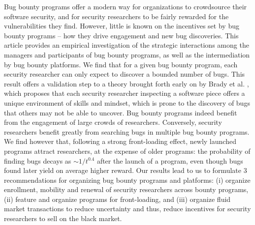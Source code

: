 Bug bounty programs offer a modern way for organizations to crowdsource their software security, and for security researchers to be fairly rewarded for the vulnerabilities they find. However, little is known on the incentives set by bug bounty programs -- how they drive engagement and new bug discoveries. This article provides an empirical investigation of the strategic interactions among the managers and participants of bug bounty programs, as well as the intermediation by bug bounty platforms. We find that for a given bug bounty program, each security researcher can only expect to discover a bounded number of bugs. This result offers a validation step to a theory brought forth early on by Brady et al. \cite{brady1999murphy}, which proposes that each security researcher inspecting a software piece offers a unique environment of skills and mindset, which is prone to the discovery of bugs that others may not be able to uncover. Bug bounty programs indeed benefit from the engagement of large crowds of researchers. Conversely, security researchers benefit greatly from searching bugs in multiple bug bounty programs. We find however that, following a strong front-loading effect, newly launched programs attract researchers, at the expense of older programs: the probability of finding bugs decays as $\sim 1/t^{0.4}$ after the launch of a program, even though bugs found later yield on average higher reward. Our results lead to us to formulate 3 recommendations for organizing bug bounty programs and platforms: (i) organize enrollment, mobility and renewal of security researchers across bounty programs, (ii) feature and organize programs for front-loading, and (iii) organize fluid market transactions to reduce uncertainty and thus, reduce incentives for security researchers to sell on the black market.



